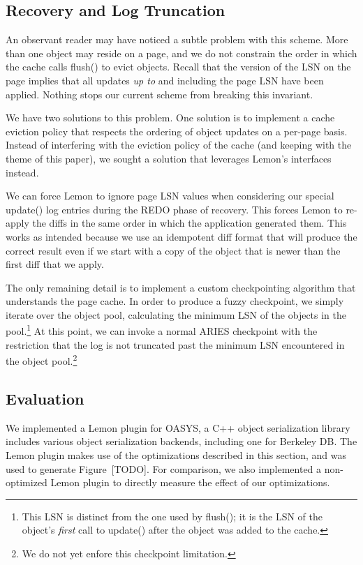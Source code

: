 \documentclass[letterpaper,twocolumn,english]{article}
\newcommand{\yad}{Lemon\xspace}
\begin{document}
\subsection{Recovery and Log Truncation}

An observant reader may have noticed a subtle problem with this
scheme.  More than one object may reside on a page, and we do not
constrain the order in which the cache calls flush() to evict objects.
Recall that the version of the LSN on the page implies that all
updates {\em up to} and including the page LSN have been applied.
Nothing stops our current scheme from breaking this invariant.  

We have two solutions to this problem.  One solution is to
implement a cache eviction policy that respects the ordering of object
updates on a per-page basis.  Instead of interfering with the eviction policy
of the cache (and keeping with the theme of this paper), we sought a
solution that leverages \yad's interfaces instead.

We can force \yad to ignore page LSN values when considering our
special update() log entries during the REDO phase of recovery.  This
forces \yad to re-apply the diffs in the same order in which the application
generated them.  This works as intended because we use an
idempotent diff format that will produce the correct result even if we
start with a copy of the object that is newer than the first diff that
we apply.

The only remaining detail is to implement a custom checkpointing
algorithm that understands the page cache.  In order to produce a
fuzzy checkpoint, we simply iterate over the object pool, calculating
the minimum LSN of the objects in the pool.\footnote{This LSN is distinct from
the one used by flush(); it is the LSN of the object's {\em first}
call to update() after the object was added to the cache.}  At this
point, we can invoke a normal ARIES checkpoint with the restriction
that the log is not truncated past the minimum LSN encountered in the
object pool.\footnote{We do not yet enfore this checkpoint limitation.}

\subsection{Evaluation}

We implemented a \yad plugin for OASYS, a C++ object serialization
library includes various object serialization backends, including one
for Berkeley DB.  The \yad plugin makes use of the optimizations
described in this section, and was used to generate Figure~[TODO].
For comparison, we also implemented a non-optimized \yad plugin to
directly measure the effect of our optimizations.
\end{document}
